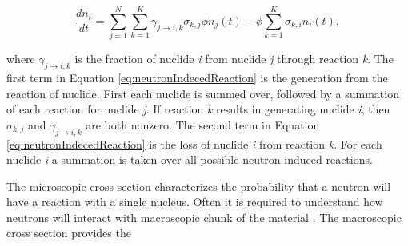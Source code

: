 \begin{equation}
    \frac{dn_{i}}{dt} = \sum_{j=1}^{N} \sum_{k=1}^{K}\gamma_{j\rightarrow i,k}\sigma_{k,j}\phi n_{j}(t) - \phi\sum_{k=1}^{K} \sigma_{k,i}n_{i}(t),
    \label{eq:neutronIndecedReaction}
\end{equation}

\noindent where $\gamma_{j\rightarrow i,k}$ is the fraction of nuclide \textit{i} from nuclide \textit{j} through reaction \textit{k}. The first term in Equation  \ref{eq:neutronIndecedReaction} is the generation from the reaction of nuclide. First each nuclide is summed over, followed by a summation of each reaction for nuclide \textit{j}. If reaction \textit{k} results in generating nuclide \textit{i}, then $\sigma_{k,j}$ and $\gamma_{j\rightarrow i,k}$ are both nonzero. The second term in Equation \ref{eq:neutronIndecedReaction} is the loss of nuclide \textit{i} from reaction \textit{k}. For each nuclide \textit{i} a summation is taken over all possible neutron induced reactions. 


The microscopic cross section characterizes the probability that a neutron will have a reaction with a single nucleus. Often it is required to understand how neutrons will interact with macroscopic chunk of the material \cite{duderstadt1976}. The macroscopic cross section provides the 

\clearpage


